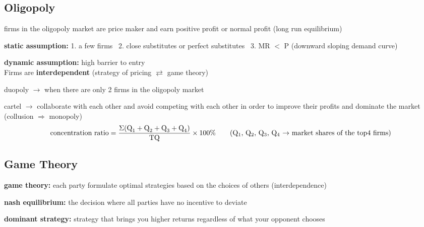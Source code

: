 \documentclass[UTF8]{article}
\begin{document}
\begin{figure}[!h]
\end{figure}

\subsection{Oligopoly}
\noindent

firms in the oligopoly market are price maker and earn positive profit or normal profit (long run equilibrium)

\textbf{static assumption:} 1. a few firms \ 2. close substitutes or perfect substitutes \ 3. MR $<$ P (downward sloping demand curve)

\textbf{dynamic assumption:} high barrier to entry\\

Firms are \textbf{interdependent} (strategy of pricing $\rightleftarrows$ game theory)

duopoly $\longrightarrow$ when there are only 2 firms in the oligopoly market

cartel $\longrightarrow$ collaborate with each other and avoid competing with each other in order to improve their profits and dominate the market (collusion $\Longrightarrow$ monopoly)
\begin{equation}
\text{concentration ratio} = {{\Sigma (\text{Q}_1+\text{Q}_2+\text{Q}_3+\text{Q}_4)}\over \text{TQ}} \times 100\% \ \ \ \ \ \ 
\text{(Q$_1$, Q$_2$, Q$_3$, Q$_4$ $\rightarrow$ market shares of the top4 firms)}
\nonumber
\end{equation}
\subsection{Game Theory}
\noindent 

\textbf{game theory:} each party formulate optimal strategies based on the choices of others (interdependence)

\textbf{nash equilibrium:} the decision where all parties have no incentive to deviate

\textbf{dominant strategy:} strategy that brings you higher returns regardless of what your opponent chooses
\end{document}
